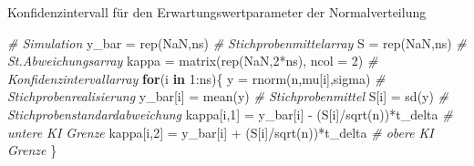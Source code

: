 \documentclass[
  8pt,
  ignorenonframetext,
]{beamer}
\newenvironment{Shaded}{\begin{snugshade}}{\end{snugshade}}
\newcommand{\AttributeTok}[1]{\textcolor[rgb]{0.77,0.63,0.00}{#1}}
\newcommand{\CommentTok}[1]{\textcolor[rgb]{0.56,0.35,0.01}{\textit{#1}}}
\newcommand{\ConstantTok}[1]{\textcolor[rgb]{0.00,0.00,0.00}{#1}}
\newcommand{\ControlFlowTok}[1]{\textcolor[rgb]{0.13,0.29,0.53}{\textbf{#1}}}
\newcommand{\DecValTok}[1]{\textcolor[rgb]{0.00,0.00,0.81}{#1}}
\newcommand{\FunctionTok}[1]{\textcolor[rgb]{0.00,0.00,0.00}{#1}}
\newcommand{\NormalTok}[1]{#1}
\newcommand{\OtherTok}[1]{\textcolor[rgb]{0.56,0.35,0.01}{#1}}
\newcommand{\SpecialCharTok}[1]{\textcolor[rgb]{0.00,0.00,0.00}{#1}}
\begin{document}
\begin{frame}[fragile]{Konfidenzintervall für den
Erwartungswertparameter der Normalverteilung}
\begin{Shaded}
\begin{Highlighting}[]
\CommentTok{\# Simulation}
\NormalTok{y\_bar   }\OtherTok{=} \FunctionTok{rep}\NormalTok{(}\ConstantTok{NaN}\NormalTok{,ns)                              }\CommentTok{\# Stichprobenmittelarray}
\NormalTok{S       }\OtherTok{=} \FunctionTok{rep}\NormalTok{(}\ConstantTok{NaN}\NormalTok{,ns)                              }\CommentTok{\# St.Abweichungsarray}
\NormalTok{kappa   }\OtherTok{=} \FunctionTok{matrix}\NormalTok{(}\FunctionTok{rep}\NormalTok{(}\ConstantTok{NaN}\NormalTok{,}\DecValTok{2}\SpecialCharTok{*}\NormalTok{ns), }\AttributeTok{ncol =} \DecValTok{2}\NormalTok{)          }\CommentTok{\# Konfidenzintervallarray}
\ControlFlowTok{for}\NormalTok{(i }\ControlFlowTok{in} \DecValTok{1}\SpecialCharTok{:}\NormalTok{ns)\{}
\NormalTok{   y          }\OtherTok{=} \FunctionTok{rnorm}\NormalTok{(n,mu[i],sigma)               }\CommentTok{\# Stichprobenrealisierung}
\NormalTok{   y\_bar[i]   }\OtherTok{=} \FunctionTok{mean}\NormalTok{(y)                            }\CommentTok{\# Stichprobenmittel}
\NormalTok{   S[i]       }\OtherTok{=} \FunctionTok{sd}\NormalTok{(y)                              }\CommentTok{\# Stichprobenstandardabweichung}
\NormalTok{   kappa[i,}\DecValTok{1}\NormalTok{] }\OtherTok{=}\NormalTok{ y\_bar[i] }\SpecialCharTok{{-}}\NormalTok{ (S[i]}\SpecialCharTok{/}\FunctionTok{sqrt}\NormalTok{(n))}\SpecialCharTok{*}\NormalTok{t\_delta  }\CommentTok{\# untere KI Grenze}
\NormalTok{   kappa[i,}\DecValTok{2}\NormalTok{] }\OtherTok{=}\NormalTok{ y\_bar[i] }\SpecialCharTok{+}\NormalTok{ (S[i]}\SpecialCharTok{/}\FunctionTok{sqrt}\NormalTok{(n))}\SpecialCharTok{*}\NormalTok{t\_delta  }\CommentTok{\# obere KI Grenze}
\NormalTok{\}}
\end{Highlighting}
\end{Shaded}
\end{frame}
\end{document}
